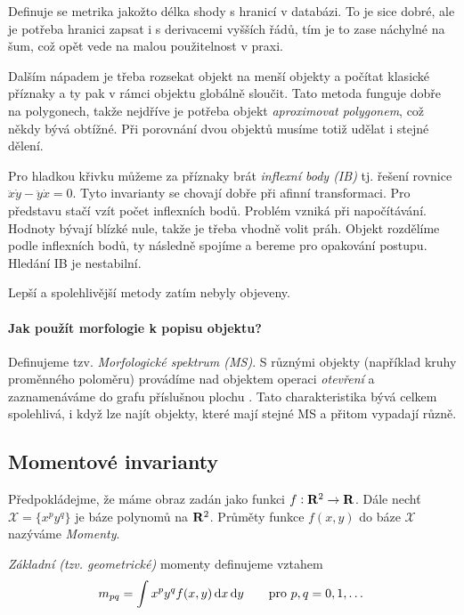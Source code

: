 Definuje se metrika jakožto délka shody s hranicí v databázi. To je sice dobré, ale je potřeba hranici zapsat i s 
derivacemi vyšších řádů, tím je to zase náchylné na šum, což opět vede na malou použitelnost v praxi.

Dalším nápadem je třeba rozsekat objekt na menší objekty a počítat klasické příznaky a ty pak v rámci objektu globálně 
sloučit. Tato metoda funguje dobře na polygonech, takže nejdříve je potřeba objekt \emph{aproximovat polygonem}, což
někdy bývá obtížné. Při porovnání dvou objektů musíme totiž udělat i stejné dělení.

Pro hladkou křivku můžeme za příznaky brát \emph{inflexní body (IB)} tj. řešení rovnice $\ddot{x}\dot{y}-\ddot{y}\dot{x}=0$.
Tyto invarianty se chovají dobře při afinní transformaci. Pro představu stačí vzít počet inflexních bodů.
Problém vzniká při napočítávání. Hodnoty bývají blízké nule, takže je třeba vhodně volit práh. Objekt rozdělíme podle 
inflexních bodů, ty následně spojíme a bereme  pro opakování postupu. Hledání IB je nestabilní.

Lepší a spolehlivější metody zatím nebyly objeveny.

\paragraph{Jak použít morfologie k popisu objektu?} Definujeme tzv. \emph{Morfologické spektrum (MS)}. S různými objekty (například
kruhy proměnného poloměru) provádíme nad objektem operaci \emph{otevření} a zaznamenáváme do grafu příslušnou plochu .
Tato charakteristika bývá celkem spolehlivá, i když lze najít objekty, které mají stejné MS a přitom vypadají různě. 


\subsection{Momentové invarianty}
Předpokládejme, že máme obraz zadán jako funkci $f:\mathbf{R}^2\rightarrow \mathbf{R} $.
Dále nechť $\mathcal{X}=\{x^py^q\}$ je báze polynomů na $\mathbf{R}^2$. Průměty funkce $f(x,y)$ do báze $\mathcal{X}$ nazýváme
\emph{Momenty}.

\emph{Základní (tzv. geometrické)} momenty definujeme vztahem
\begin{equation}
m_{pq}=\int x^py^qf(x,y)\dif x\dif y\qquad \hbox{pro $p,q=0,1,\dots$}
\end{equation}

